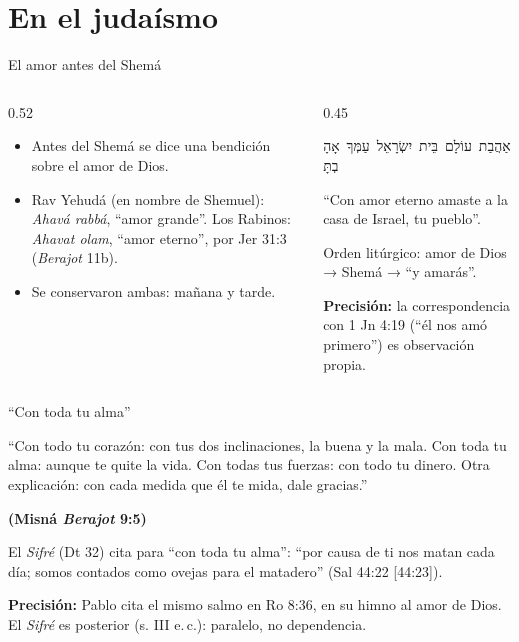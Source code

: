 \documentclass[hyperref={bookmarks=false},aspectratio=169]{beamer}
\newcommand{\heb}[1]{\mbox{\foreignlanguage{hebrew}{#1}}}
\newcommand{\fuente}[1]{\par\hfill{\upshape\bfseries\footnotesize\textcolor{azul}{#1}}}
\newcommand{\precision}[1]{{\footnotesize\color{gris}\textbf{Precisión:} #1}}
\begin{document}
\section{En el judaísmo}

\begin{frame}{El amor antes del Shemá}
\begin{columns}[c,onlytextwidth]
\begin{column}{0.52\textwidth}\small
\begin{itemize}
\item Antes del Shemá se dice una bendición sobre el amor de Dios.
\item Rav Yehudá (en nombre de Shemuel): \emph{Ahavá rabbá}, ``amor grande''. Los Rabinos: \emph{Ahavat olam}, ``amor eterno'', por Jer 31:3 (\emph{Berajot} 11b).
\item Se conservaron ambas: mañana y tarde.
\end{itemize}
\end{column}
\begin{column}{0.45\textwidth}
\begin{center}\heb{אַהֲבַת עוֹלָם בֵּית יִשְׂרָאֵל עַמְּךָ אָהָבְתָּ}\end{center}
\small ``Con amor eterno amaste a la casa de Israel, tu pueblo''.\par\medskip
Orden litúrgico: amor de Dios → Shemá → ``y amarás''.\par
\precision{la correspondencia con 1 Jn 4:19 (``él nos amó primero'') es observación propia.}
\end{column}
\end{columns}
\end{frame}

\begin{frame}{``Con toda tu alma''}
\begin{tcolorbox}[colback=papiro,colframe=azul,boxrule=0.8pt,arc=3pt]
\small ``Con todo tu corazón: con tus dos inclinaciones, la buena y la mala. Con toda tu alma: aunque te quite la vida. Con todas tus fuerzas: con todo tu dinero. Otra explicación: con cada medida que él te mida, dale gracias.''\fuente{(Misná \emph{Berajot} 9:5)}
\end{tcolorbox}
\small El \emph{Sifré} (Dt 32) cita para ``con toda tu alma'': ``por causa de ti nos matan cada día; somos contados como ovejas para el matadero'' (Sal 44:22 [44:23]).\par\medskip
\precision{Pablo cita el mismo salmo en Ro 8:36, en su himno al amor de Dios. El \emph{Sifré} es posterior (s. III e.\,c.): paralelo, no dependencia.}
\end{frame}
\end{document}
